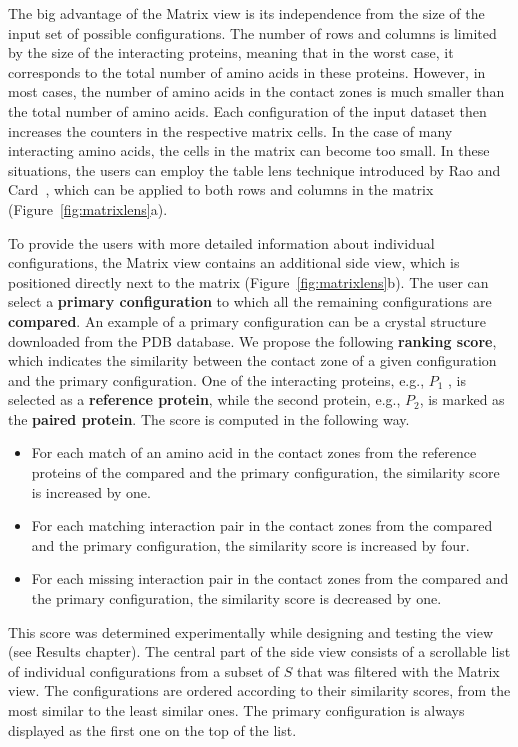 \documentclass{bmcart}
\def\MatView {Matrix view\xspace}
\begin{document}
The big advantage of the \MatView is its independence from the size of the input set of possible configurations.
The number of rows and columns is limited by the size of the interacting proteins, meaning that in the worst case, it corresponds to the total number of amino acids in these proteins.
However, in most cases, the number of amino acids in the contact zones is much smaller than the total number of amino acids.
Each configuration of the input dataset then increases the counters in the respective matrix cells.
In the case of many interacting amino acids, the cells in the matrix can become too small.
In these situations, the users can employ the table lens technique introduced by Rao and Card~\cite{Rao1994}, which can be applied to both rows and columns in the matrix (Figure~\ref{fig:matrixlens}a).

To provide the users with more detailed information about individual configurations, the \MatView contains an additional side view, which is positioned directly next to the matrix (Figure~\ref{fig:matrixlens}b).
The user can select a \textbf{primary configuration} to which all the remaining configurations are \textbf{compared}.
An example of a primary configuration can be a crystal structure downloaded from the PDB database.
We propose the following \textbf{ranking score}, which indicates the similarity between the contact zone of a given configuration and the primary configuration.
One of the interacting proteins, e.g., $P_1$ , is selected as a \textbf{reference protein}, while the second protein, e.g., $P_2$, is marked as the \textbf{paired protein}.
The score is computed in the following way.
\begin{itemize}
\item For each match of an amino acid in the contact zones from the reference proteins of the compared and the primary configuration, the similarity score is increased by one.
\item For each matching interaction pair in the contact zones from the compared and the primary configuration, the similarity score is increased by four.
\item For each missing interaction pair in the contact zones from the compared and the primary configuration, the similarity score is decreased by one.
\end{itemize}
This score was determined experimentally while designing and testing the view (see Results chapter). 
The central part of the side view consists of a scrollable list of individual configurations from a subset of $S$ that was filtered with the \MatView.
The configurations are ordered according to their similarity scores, from the most similar to the least similar ones.
The primary configuration is always displayed as the first one on the top of the list.
\end{document}
